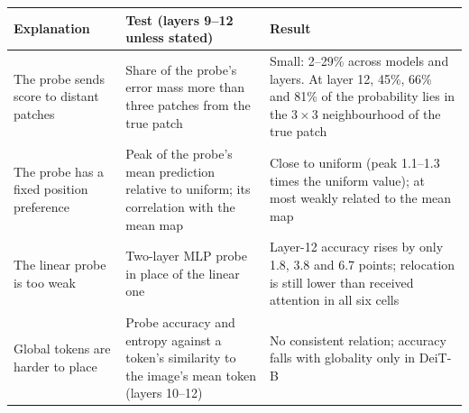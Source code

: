 \footnotesize
\setlength{\tabcolsep}{4pt}
\renewcommand{\arraystretch}{1.0}
\begin{tabular}{@{}>{\raggedright\arraybackslash}p{2.9cm}>{\raggedright\arraybackslash}p{4.7cm}>{\raggedright\arraybackslash}p{5.75cm}@{}}
\toprule
Explanation & Test (layers 9--12 unless stated) & Result \\
\midrule
The probe sends score to distant patches & Share of the probe's error mass more than three patches from the true patch & Small: 2--29\% across models and layers. At layer 12, 45\%, 66\% and 81\% of the probability lies in the $3{\times}3$ neighbourhood of the true patch \\
The probe has a fixed position preference & Peak of the probe's mean prediction relative to uniform; its correlation with the mean map & Close to uniform (peak 1.1--1.3 times the uniform value); at most weakly related to the mean map \\
The linear probe is too weak & Two-layer MLP probe in place of the linear one & Layer-12 accuracy rises by only 1.8, 3.8 and 6.7 points; relocation is still lower than received attention in all six cells \\
Global tokens are harder to place & Probe accuracy and entropy against a token's similarity to the image's mean token (layers 10--12) & No consistent relation; accuracy falls with globality only in DeiT-B \\
\bottomrule
\end{tabular}

